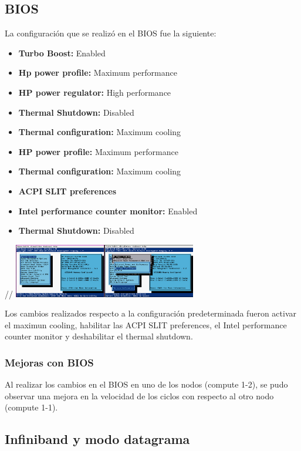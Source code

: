 \documentclass[conference,compsoc]{IEEEtran}
\begin{document}
\subsection{BIOS}

La configuración que se realizó en el BIOS fue la siguiente:

\begin{itemize}
    \item \textbf{Turbo Boost:} Enabled
    \item \textbf{Hp power profile:} Maximum performance
    \item \textbf{HP power regulator:} High performance 
    \item \textbf{Thermal Shutdown:} Disabled
    \item \textbf{Thermal configuration:} Maximum cooling
    \item \textbf{HP power profile:} Maximum performance
    \item \textbf{Thermal configuration:} Maximum cooling
    \item \textbf{ACPI SLIT preferences}
    \item \textbf{Intel performance counter monitor:} Enabled
    \item \textbf{Thermal Shutdown:} Disabled
\end{itemize}//
\includegraphics[width=8cm]{BIOS.png}

Los cambios realizados respecto a la configuración predeterminada fueron activar el maximun cooling, habilitar las ACPI SLIT preferences, el Intel performance counter monitor y deshabilitar el thermal shutdown.

\subsubsection{Mejoras con BIOS}

Al realizar los cambios en el BIOS en uno de los nodos (compute 1-2), se pudo observar una mejora en la velocidad de los ciclos con respecto al otro nodo (compute 1-1).

\subsection{Infiniband y modo datagrama}
\end{document}
